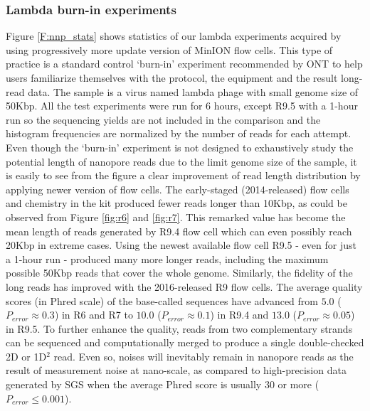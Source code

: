 \subsubsection{Lambda burn-in experiments} 
Figure \ref{F:nnp_stats} shows statistics of our lambda experiments acquired by using progressively more update version of MinION flow cells. This type of practice is a standard control `burn-in' experiment recommended by ONT to help users familiarize themselves with the protocol, the equipment and the result long-read data. The sample is a virus named lambda phage with small genome size of 50Kbp. All the test experiments were run for 6 hours, except R9.5 with a 1-hour run so the sequencing yields are not included in the comparison and the histogram frequencies are normalized by the number of reads for each attempt. Even though the `burn-in' experiment is not designed to exhaustively study the potential length of nanopore reads due to the limit genome size of the sample, it is easily to see from the figure a clear improvement of read length distribution by applying newer version of flow cells. The early-staged (2014-released) flow cells and chemistry in the kit produced fewer reads longer than 10Kbp, as could be observed from Figure \ref{fig:r6} and \ref{fig:r7}. 
This remarked value has become the mean length of reads generated by R9.4 flow cell which can even possibly reach 20Kbp in extreme cases. 
Using the newest available flow cell R9.5 - even for just a 1-hour run - produced many more longer reads, including the maximum possible 50Kbp reads that cover the whole genome.  
Similarly, the fidelity of the long reads has improved with the 2016-released R9 flow cells. The average quality scores (in Phred scale) of the base-called sequences have advanced from $5.0$ ($P_{error} \approx 0.3$) in R6 and R7 to $10.0$ ($P_{error} \approx 0.1$) in R9.4 and $13.0$ ($P_{error} \approx 0.05$) in R9.5. 
To further enhance the quality, reads from two complementary strands can be sequenced and computationally merged to produce a single double-checked 2D or 1D$^2$ read.
Even so, noises will inevitably remain in nanopore reads as the result of measurement noise at nano-scale, as compared to high-precision data generated by SGS when the average Phred score is usually 30 or more ($P_{error} \leq 0.001$).

